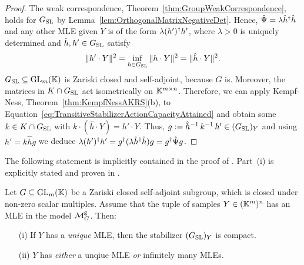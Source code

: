 \begin{proof}
	The weak correspondence, Theorem~\ref{thm:GroupWeakCorrespondence}, holds for $G_{\operatorname{SL}}$ by Lemma~\ref{lem:OrthogonalMatrixNegativeDet}. Hence, $\hat{\Psi} = \lambda \hat{h}^{\dagger} \hat{h}$ and any other MLE given $Y$ is of the form $\lambda (h')^{\dagger} h'$, where $\lambda > 0$ is uniquely determined and $\hat{h}, h' \in G_{\operatorname{SL}}$ satisfy
		\begin{equation}\label{eq:TransitiveStabilizerActionCapacityAttained}
			\| h' \cdot Y \|^2 = \inf_{h \in G_{\operatorname{SL}}} \| h \cdot Y \|^2 = \| \hat{h} \cdot Y \|^2.
		\end{equation}	
	$G_{\operatorname{SL}} \subseteq \operatorname{GL}_m(\mathbb K)$ is Zariski closed and self-adjoint, because $G$ is. Moreover, the matrices in $K \cap G_{\operatorname{SL}}$ act isometrically on $\mathbb K^{m \times n}$. Therefore, we can apply Kempf-Ness, Theorem~\ref{thm:KempfNessAKRS}(b), to Equation~\eqref{eq:TransitiveStabilizerActionCapacityAttained} and obtain some $k \in K \cap G_{\operatorname{SL}}$ with $k \cdot (\hat{h} \cdot Y) = h' \cdot Y$. Thus, $g := \hat{h}^{-1} \, k^{-1} \, h' \in (G_{\operatorname{SL}})_Y$ and using $h' = k \hat{h} g$ we deduce $\lambda (h')^{\dagger} h' = g^{\dagger} (\lambda \hat{h}^{\dagger} \hat{h})g = g^{\dagger} \hat{\Psi} g$.
\end{proof}

The following statement is implicitly contained in the proof of \cite[Theorems~3.10 and~3.15]{SiagaPaper}. Part~(i) is explicitly stated and proven in \cite[Corollary~2.5]{DMW22TensorNormal}.

\begin{prop} \label{prop:UniqueMLEcompactStabilizer}
	Let $G \subseteq \operatorname{GL}_m(\mathbb K)$ be a Zariski closed self-adjoint subgroup, which is closed under non-zero scalar multiples. Assume that the tuple of samples $Y \in (\mathbb K^m)^n$ has an MLE in the model $\mathcal{M}^{\mathtt{g}}_G$. Then:
	\begin{itemize}
		\item[(i)] If $Y$ has a \emph{unique} MLE, then the stabilizer $(G_{\operatorname{SL}})_Y$ is compact.
		
		\item[(ii)] $Y$ has \emph{either} a unqiue MLE \emph{or} infinitely many MLEs.
	\end{itemize}
\end{prop}

